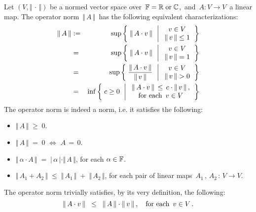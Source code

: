 \begin{remark}
\mbox{}
\vskip 0.1cm
\noindent
Let $(V,\Vert\,\cdot\,\Vert)$ be a normed vector space over \,$\mathbb{F} = \mathbb{R} \;\textnormal{or}\; \mathbb{C}$,\,
and \,$A : V \longrightarrow V$\, a linear map.
The operator norm \,$\Vert\, A \,\Vert$\, has the following equivalent characterizations:
\begin{eqnarray*}
\Vert\,A\,\Vert
& := &
	\sup\left\{\;
		\Vert\, A \cdot v \,\Vert
		\,\;\left\vert\;
			\begin{array}{c}
			v \in V
			\\
			\Vert\, v \,\Vert \leq 1
			\end{array}
			\right. 
		\right\}
\\
& = &
	\sup\left\{\;
		\Vert\, A \cdot v \,\Vert
		\,\;\left\vert\;
			\begin{array}{c}
			v \in V
			\\
			\Vert\, v \,\Vert = 1
			\end{array}
			\right. 
		\right\}
\\
& = &
	\sup\left\{\;
		\dfrac{ \Vert\, A \cdot v \,\Vert }{ \Vert\, v \,\Vert }
		\,\;\left\vert\;
			\begin{array}{c}
			v \in V
			\\
			\Vert\, v \,\Vert > 0
			\end{array}
			\right. 
		\right\}
\\
& = &
	\inf\left\{\;
		c \geq 0
		\,\;\left\vert\;
			\begin{array}{c}
			\Vert\,A \cdot v\,\Vert \,\leq\, c \cdot \Vert\,v\,\Vert\,,
			\\
			\textnormal{for each \,$v \in V$}
			\end{array}
			\right.
		\right\}
\end{eqnarray*}
The operator norm is indeed a norm, i.e. it satisfies the following:
\begin{itemize}
\item
	$\Vert\, A \,\Vert \; \geq \; 0$.
\item
	$\Vert\, A \,\Vert \; = \; 0$ \; $\Longleftrightarrow$ \; $A \, = \, 0$.
\item
	$\Vert\, \alpha \cdot A \,\Vert \; = \; \vert\, \alpha \,\vert \cdot \Vert\, A \,\Vert$,\; for each $\alpha \in \mathbb{F}$.
\item
	$\Vert\, A_{1} + A_{2} \,\Vert \;\leq\; \Vert\, A_{1} \,\Vert \;+\; \Vert \, A_{2} \,\Vert$,\;
	for each pair of linear maps \,$A_{1} \,,\, A_{2} \,:\, V \longrightarrow V$.
\end{itemize}
The operator norm trivially satisfies, by its very definition, the following:
\begin{equation*}
\Vert\, A \cdot v \,\Vert \;\; \leq \;\; \Vert\, A \,\Vert \cdot \Vert\, v \,\Vert\,,
\quad
\textnormal{for each \,$v \in V$}\,.
\end{equation*}
\end{remark}

